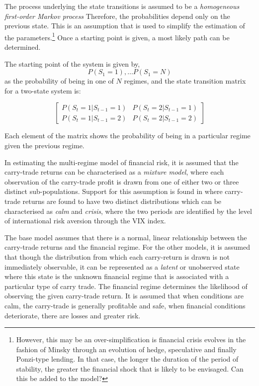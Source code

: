 \documentclass[12pt, a4paper, oneside]{article}\usepackage[]{graphicx}\usepackage[]{color}
\begin{document}
The process underlying the state transitions is assumed to be a \emph{homogeneous first-order Markov process}  Therefore, the probabilities depend only on the previous state. This is an assumption that is used to simplify the estimation of the parameters.\footnote{However, this may be an over-simplification is financial crisis evolves in the fashion of Minsky through an evolution of hedge, speculative and finally Ponzi-type lending. In that case, the longer the duration of the period of stability, the greater the financial shock that is likely to be envisaged.  Can this be added to the model?} Once a starting point is given, a most likely path can be determined. 


The starting point of the system is given by,
\begin{equation*}
P(S_1 = 1), \dots P(S_1 = N)
\end{equation*}
as the probability of being in one of $N$ regimes, and the state transition matrix for a two-state system is:

\begin{equation*}
\begin{bmatrix}
P(S_t = 1|S_{t-1}=1)  & P(S_t = 2|S_{t-1}=1)\\
P(S_t = 1|S_{t-1}=2)  & P(S_t = 2|S_{t-1}=2)
\end{bmatrix}
\end{equation*}

Each element of the matrix shows the probability of being in a particular regime given the previous regime. 

In estimating the multi-regime model of financial risk, it is assumed that the carry-trade returns can be characterised as a \emph{mixture model}, where each observation of the carry-trade profit is drawn from one of either two or three distinct sub-populations.   Support for this assumption is found in \citet{Hayward2013} where carry-trade returns are found to have two distinct distributions which can be characterised as \emph{calm} and \emph{crisis}, where the two periods are identified by the level of international risk aversion through the VIX index. 

The base model assumes that there is a normal, linear relationship between the carry-trade returns and the financial regime. For the other models, it is assumed that though the distribution from which each carry-return is drawn is not immediately observable, it can be represented as a \emph{latent} or unobserved state where this state is the unknown financial regime that is associated with a particular type of carry trade.  The financial regime determines the likelihood of observing the given carry-trade return.  It is assumed that when conditions are calm, the carry-trade is generally profitable and safe, when financial conditions deteriorate, there are losses and greater risk. 
\end{document}
